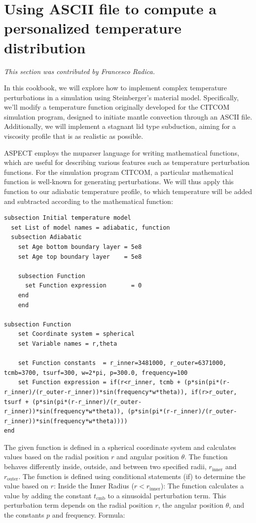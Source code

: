 \documentclass{article}
\begin{document}
\section*{Using ASCII file to compute a personalized temperature distribution}

\textit{This section was contributed by Francesco Radica.}

In this cookbook, we will explore how to implement complex temperature perturbations in a simulation using Steinberger's material model. Specifically, we'll modify a temperature function originally developed for the CITCOM simulation program, designed to initiate mantle convection through an ASCII file. Additionally, we will implement a stagnant lid type subduction, aiming for a viscosity profile that is as realistic as possible.

ASPECT employs the muparser language for writing mathematical functions, which are useful for describing various features such as temperature perturbation functions. For the simulation program CITCOM, a particular mathematical function is well-known for generating perturbations. We will thus apply this function to our adiabatic temperature profile, to which temperature will be added and subtracted according to the mathematical function:

\begin{verbatim}
subsection Initial temperature model
  set List of model names = adiabatic, function
  subsection Adiabatic
    set Age bottom boundary layer = 5e8
    set Age top boundary layer    = 5e8

    subsection Function
      set Function expression       = 0
    end
    end
    
subsection Function
    set Coordinate system = spherical
    set Variable names = r,theta

    set Function constants  = r_inner=3481000, r_outer=6371000, tcmb=3700, tsurf=300, w=2*pi, p=300.0, frequency=100
    set Function expression = if(r<r_inner, tcmb + (p*sin(pi*(r-r_inner)/(r_outer-r_inner))*sin(frequency*w*theta)), if(r>r_outer, tsurf + (p*sin(pi*(r-r_inner)/(r_outer-r_inner))*sin(frequency*w*theta)), (p*sin(pi*(r-r_inner)/(r_outer-r_inner))*sin(frequency*w*theta))))
end
\end{verbatim}

The given function is defined in a spherical coordinate system and calculates values based on the radial position \(r\) and angular position \(\theta\). The function behaves differently inside, outside, and between two specified radii, \(r_{\text{inner}}\) and \(r_{\text{outer}}\).
The function is defined using conditional statements (if) to determine the value based on \(r\):
Inside the Inner Radius (\(r < r_{\text{inner}}\)): The function calculates a value by adding the constant \(t_{\text{cmb}}\) to a sinusoidal perturbation term. This perturbation term depends on the radial position \(r\), the angular position \(\theta\), and the constants \(p\) and frequency.
Formula:
\end{document}
